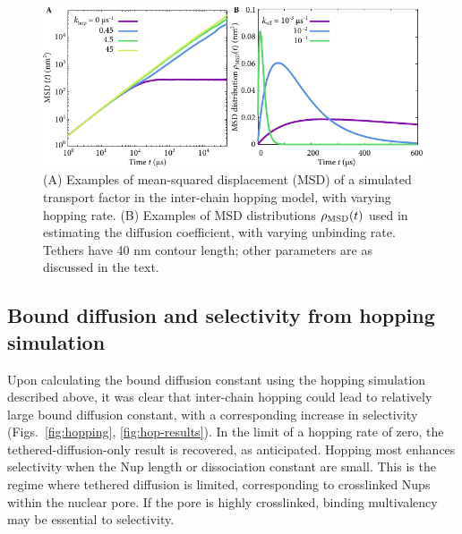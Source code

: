 \begin{figure}[h!]
\centering
\includegraphics[width=0.7\linewidth]{figs/ch02/integrand-example-plots.pdf}
\caption[Mean-squared displacement in the hopping simulation.]{(A) Examples of mean-squared displacement (MSD) of a simulated transport factor in the inter-chain hopping model, with varying hopping rate.  (B) Examples of MSD distributions $\rho_{\mathrm{MSD}} (t)$ used in estimating the diffusion coefficient, with varying unbinding rate. Tethers have 40 nm contour length; other parameters are as discussed in the text.}
\label{fig:integrand}
\end{figure}

\subsection{Bound diffusion and selectivity from hopping simulation}

Upon calculating the bound diffusion constant using the hopping simulation described above, it was clear that inter-chain hopping could lead to relatively large bound diffusion constant, with a corresponding increase in selectivity (Figs.~\ref{fig:hopping}, \ref{fig:hop-results}).  In the limit of a hopping rate of zero, the tethered-diffusion-only result is recovered, as anticipated.  Hopping most enhances selectivity when the Nup length or dissociation constant are small.  This is the regime where tethered diffusion is limited, corresponding to crosslinked Nups within the nuclear pore.  If the pore is highly crosslinked, binding multivalency may be essential to selectivity.

